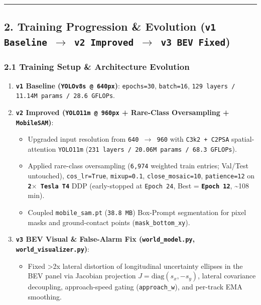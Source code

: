 \documentclass[10.5pt,a4paper]{article}
\begin{document}
\par\noindent\rule{\textwidth}{0.4pt}\par\medskip

\subsection{2. Training Progression \& Evolution (\texttt{v1 Baseline $\rightarrow$ v2 Improved $\rightarrow$ v3 BEV Fixed})}

\subsubsection{2.1 Training Setup \& Architecture Evolution}
\begin{enumerate}[leftmargin=1.8em,itemsep=2pt]
\item \textbf{\texttt{v1} Baseline (\texttt{YOLOv8s @ 640px})}: \texttt{epochs=30}, \texttt{batch=16}, \texttt{129 layers /\allowbreak{} 11.\allowbreak{}14M params /\allowbreak{} 28.\allowbreak{}6 GFLOPs}.
\item \textbf{\texttt{v2} Improved (\texttt{YOLO11m @ 960px} + Rare-Class Oversampling + \texttt{MobileSAM})}:
\begin{itemize}[leftmargin=1.5em,itemsep=2pt]
\item Upgraded input resolution from \texttt{640 $\rightarrow$ 960} with \texttt{C3k2 + C2PSA} spatial-attention \texttt{YOLO11m} (\texttt{231 layers /\allowbreak{} 20.\allowbreak{}06M params /\allowbreak{} 68.\allowbreak{}3 GFLOPs}).
\item Applied rare-class oversampling (\texttt{6,\allowbreak{}974} weighted train entries; Val/Test untouched), \texttt{cos\_\allowbreak{}lr=True}, \texttt{mixup=0.\allowbreak{}1}, \texttt{close\_\allowbreak{}mosaic=10}, \texttt{patience=12} on \textbf{\texttt{2$\times$ Tesla T4}} DDP (early-stopped at \texttt{Epoch 24}, Best = \textbf{\texttt{Epoch 12}}, \textasciitilde{}108 min).
\item Coupled \texttt{mobile\_\allowbreak{}sam.\allowbreak{}pt} (\texttt{38.\allowbreak{}8 MB}) Box-Prompt segmentation for pixel masks and ground-contact points (\texttt{mask\_\allowbreak{}bottom\_\allowbreak{}xy}).
\end{itemize}
\item \textbf{\texttt{v3} BEV Visual \& False-Alarm Fix (\texttt{world\_\allowbreak{}model.\allowbreak{}py}, \texttt{world\_\allowbreak{}visualizer.\allowbreak{}py})}:
\begin{itemize}[leftmargin=1.5em,itemsep=2pt]
\item Fixed >2x lateral distortion of longitudinal uncertainty ellipses in the BEV panel via Jacobian projection $J=\text{diag}(s_x,-s_y)$, lateral covariance decoupling, approach-speed gating (\texttt{approach\_\allowbreak{}w}), and per-track EMA smoothing.
\end{itemize}
\end{enumerate}
\end{document}
